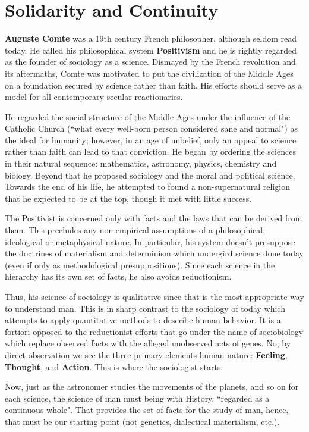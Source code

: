 \section{Solidarity and Continuity}

\textbf{Auguste Comte} was a 19th century French philosopher, although seldom read today. He called his philosophical system \textbf{Positivism} and he is rightly regarded as the founder of sociology as a science. Dismayed by the French revolution and its aftermaths, Comte was motivated to put the civilization of the Middle Ages on a foundation secured by science rather than faith. His efforts should serve as a model for all contemporary secular reactionaries.

He regarded the social structure of the Middle Ages under the influence of the Catholic Church (``what every well-born person considered sane and normal") as the ideal for humanity; however, in an age of unbelief, only an appeal to science rather than faith can lead to that conviction. He began by ordering the sciences in their natural sequence: mathematics, astronomy, physics, chemistry and biology. Beyond that he proposed sociology and the moral and political science. Towards the end of his life, he attempted to found a non-supernatural religion that he expected to be at the top, though it met with little success.

The Positivist is concerned only with facts and the laws that can be derived from them. This precludes any non-empirical assumptions of a philosophical, ideological or metaphysical nature. In particular, his system doesn't presuppose the doctrines of materialism and determinism which undergird science done today (even if only as methodological presuppositions). Since each science in the hierarchy has its own set of facts, he also avoids reductionism.

Thus, his science of sociology is qualitative since that is the most appropriate way to understand man. This is in sharp contrast to the sociology of today which attempts to apply quantitative methods to describe human behavior. It is a fortiori opposed to the reductionist efforts that go under the name of sociobiology which replace observed facts with the alleged unobserved acts of genes. No, by direct observation we see the three primary elements human nature: \textbf{Feeling}, \textbf{Thought}, and \textbf{Action}. This is where the sociologist starts.

Now, just as the astronomer studies the movements of the planets, and so on for each science, the science of man must being with History, ``regarded as a continuous whole". That provides the set of facts for the study of man, hence, that must be our starting point (not genetics, dialectical materialism, etc.).

